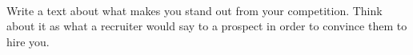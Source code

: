 \documentclass[9pt, blue]{./template/developercv} %
\begin{document}
\begin{minipage}[t]{0.45\textwidth}
	\vspace{-\baselineskip} %
	\\
	\begin{minipage}[t]{\textwidth}
		\hspace{7mm} 
		\hspace{7mm} 
		\hspace{7mm} 
		\hspace{7mm} 
		\hspace{7mm} 
		\hspace{7mm} 
		\hspace{7mm} 
		\vspace{2.5mm}
	\end{minipage}
\end{minipage}

\vspace{-6mm}

\vspace{2.1mm}
{\small 
\hspace{10pt} Write a text about what makes you stand out from your competition. Think about it as what a recruiter would say to a prospect in order to convince them to hire you. \lorem \lorem \\

\vspace{-0.7em}
\hspace{10pt} \lorem \lorem \lorem \lorem \lorem}
\end{document}
